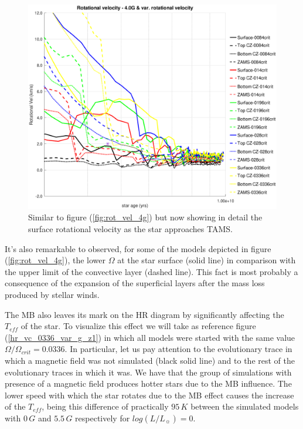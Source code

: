 \documentclass[fleqn,usenatbib]{mnras}
\begin{document}
\begin{figure}
	\includegraphics[trim = 30mm 15mm 20mm 15mm, clip,width=\columnwidth]{figures/rot_vel_var_vel_4_0g_z1.eps}
    \caption{Similar to figure (\ref{fig:rot_vel_4g}) but now showing in detail the surface rotational velocity as the star approaches TAMS.}
    \label{fig:rot_vel_4g_z1}
\end{figure}

It's also remarkable to observed, for some of the models depicted in figure (\ref{fig:rot_vel_4g}), the lower $\Omega$ at the star surface (solid line) in comparison with the upper limit of the convective layer (dashed line). This fact is most probably a consequence of the expansion of the superficial layers after the mass loss produced by stellar winds.\par

The MB also leaves its mark on the HR diagram by significantly affecting the $T_{eff}$ of the star. To visualize this effect we will take as reference figure (\ref{hr_vc_0336_var_g_z1}) in which all models were started with the same value $\Omega / \Omega_{crit}=0.0336$. In particular, let us pay attention to the evolutionary trace in which a magnetic field was not simulated (black solid line) and to the rest of the evolutionary traces in which it was. We have that the group of simulations with presence of a magnetic field produces hotter stars due to the MB influence. The lower speed with which the star rotates due to the MB effect causes the increase of the $T_{eff}$, being this difference of practically $95\,K$ between the simulated models with $0\,G$ and $5.5\,G$ respectively for $log(L/L_{\sun})=0$.
\end{document}
